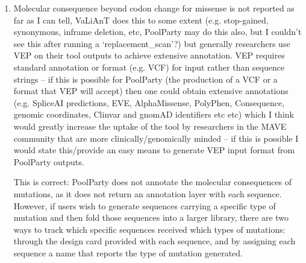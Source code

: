 \documentclass[11pt]{article}
\newenvironment{response}{\par\color{responseblue}}{\par}
\newenvironment{msquote}
  {\begin{quote}\color{quotedtext}\noindent\ignorespaces}
  {\end{quote}}
\begin{document}
\begin{enumerate}
\begin{response}
\begin{msquote}
  PoolParty was designed to solve a specific computational problem: streamlining the design of DNA sequence libraries for a wide range of experimental applications and in silico studies. As such, it has several limitations. First, PoolParty operates on sequences, not genomic loci or transcript models. It can accept genomic coordinates as input to extract sequences from FASTA files, but does not interpret transcript annotations (e.g., in GFF/GTF files) or keep track of genomic coordinates through subsequent design steps. This may make PoolParty less helpful for certain genome-editing applications (e.g., as compared to VaLiAnT).
\end{msquote}
In the new Supplemental Information document, we have also added two tables that explicitly compare the features and capabilities of PoolParty with existing tools (Tables~S2 and S3). 
\end{response}

\item Molecular consequence beyond codon change for missense is not reported as
far as I can tell, VaLiAnT does this to some extent (e.g. stop-gained,
synonymous, inframe deletion, etc, PoolParty may do this also, but I couldn't
see this after running a `replacement\_scan'?) but generally researchers use VEP
on their tool outputs to achieve extensive annotation. VEP requires standard
annotation or format (e.g. VCF) for input rather than sequence strings -- if
this is possible for PoolParty (the production of a VCF or a format that VEP
will accept) then one could obtain extensive annotations (e.g. SpliceAI
predictions, EVE, AlphaMissense, PolyPhen, Consequence, genomic coordinates,
Clinvar and gnomAD identifiers etc etc) which I think would greatly increase the
uptake of the tool by researchers in the MAVE community that are more
clinically/genomically minded -- if this is possible I would state this/provide
an easy means to generate VEP input format from PoolParty outputs.

\begin{response}
This is correct: PoolParty does not annotate the molecular consequences of mutations, as it does not return an annotation layer with each sequence. However, if users wish to generate sequences carrying a specific type of mutation and then fold those sequences into a larger library, there are two ways to track which specific sequences received which types of mutations: through the design card provided with each sequence, and by assigning each sequence a name that reports the type of mutation generated.


\end{response}
\end{enumerate}
\end{document}
